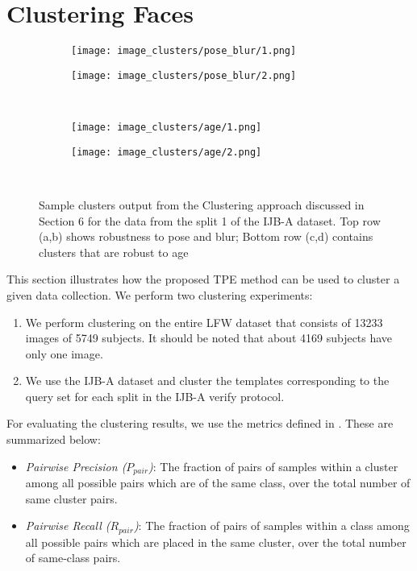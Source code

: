 \documentclass[10pt,twocolumn,letterpaper]{article}
\begin{document}
 \section{Clustering Faces}\label{sec:cluster}


\begin{figure*}
\begin{subfigure}{.5\textwidth}
  \centering
  \texttt{[image: image\_clusters/pose\_blur/1.png]}
  \caption{}
  \label{fig:sfig1}
\end{subfigure}\begin{subfigure}{.5\textwidth}
  \centering
  \texttt{[image: image\_clusters/pose\_blur/2.png]}
    \caption{}
  \label{fig:sfig2}
\end{subfigure}\\
\begin{subfigure}{.5\textwidth}
  \centering
  \texttt{[image: image\_clusters/age/1.png]}
    \caption{}
  \label{fig:sfig3}
\end{subfigure}\begin{subfigure}{.5\textwidth}
  \centering
  \texttt{[image: image\_clusters/age/2.png]}
    \caption{}
  \label{fig:sfig4}
\end{subfigure} \\
\caption{Sample clusters output from the Clustering approach discussed in Section 6 for the data from the split 1 of the IJB-A dataset. Top row (a,b) shows robustness to pose and blur; Bottom row (c,d) contains clusters that are robust to age}
\label{fig:cluster}
\end{figure*}

This section illustrates how the proposed TPE method can be used to cluster a
given data collection. We perform two clustering experiments:
\begin{enumerate}[leftmargin=*]
\item We perform clustering on the entire LFW \cite{lfw} dataset that consists
  of 13233 images of 5749 subjects. It should be noted that about 4169 subjects have only one image.
\item We use the IJB-A dataset and cluster the templates corresponding to the query set for each split in the IJB-A verify protocol.
\end{enumerate}

For evaluating the clustering results, we use the metrics defined in
\cite{msu_cluster}. These are summarized below:
\begin{itemize}[leftmargin=*]
\item \textit{Pairwise Precision ($P_{pair}$)}: The fraction of pairs of samples
  within a cluster among all possible pairs which are of the same class, over
  the total number of same cluster pairs.
\item \textit{Pairwise Recall ($R_{pair}$)}: The fraction of pairs of samples
  within a class among all possible pairs which are placed in the same cluster,
  over the total number of same-class pairs.
\end{itemize}
\end{document}

